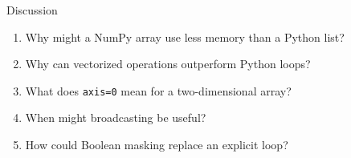 \documentclass[11pt,aspectratio=43]{beamer}
\begin{document}
\begin{frame}{Discussion}

\begin{enumerate}
\item Why might a NumPy array use less memory than a Python list?
\item Why can vectorized operations outperform Python loops?
\item What does \texttt{axis=0} mean for a two-dimensional array?
\item When might broadcasting be useful?
\item How could Boolean masking replace an explicit loop?
\end{enumerate}

\end{frame}
\end{document}
